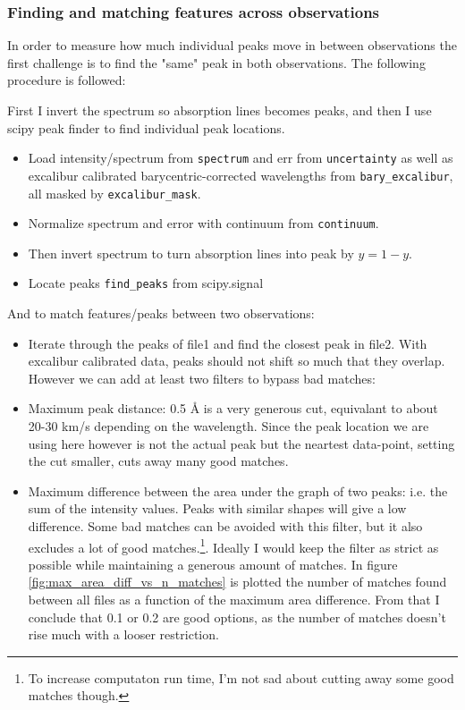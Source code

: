     \subsubsection{Finding and matching features across observations}

    In order to measure how much individual peaks move in between observations the first challenge is to find the "same" peak in both observations. The following procedure is followed: 
    
    
    First I invert the spectrum so absorption lines becomes peaks, and then I use scipy peak finder to find individual peak locations. 

    \begin{itemize}
        \item Load intensity/spectrum from \verb|spectrum| and err from \verb|uncertainty| as well as excalibur calibrated barycentric-corrected wavelengths from \verb|bary_excalibur|, all masked by \verb|excalibur_mask|.
        \item Normalize spectrum and error with continuum from \verb|continuum|.
        \item Then invert spectrum to turn absorption lines into peak by $y = 1 - y$.
        \item Locate peaks \verb|find_peaks| from scipy.signal
    \end{itemize}

    And to match features/peaks between two observations:
    \begin{itemize}
        \item Iterate through the peaks of file1 and find the closest peak in file2. With excalibur calibrated data, peaks should not shift so much that they overlap. However we can add at least two filters to bypass bad matches:
        \item Maximum peak distance: 0.5 Å is a very generous cut, equivalant to about 20-30 km/s depending on the wavelength. Since the peak location we are using here however is not the actual peak but the neartest data-point, setting the cut smaller, cuts away many good matches.
        \item Maximum difference between the area under the graph of two peaks: i.e. the sum of the intensity values. Peaks with similar shapes will give a low difference. Some bad matches can be avoided with this filter, but it also excludes a lot of good matches.\footnote{To increase computaton run time, I'm not sad about cutting away some good matches though.}. Ideally I would keep the filter as strict as possible while maintaining a generous amount of matches. In figure \ref{fig:max_area_diff_vs_n_matches} is plotted the number of matches found between all files as a function of the maximum area difference. From that I conclude that 0.1 or 0.2 are good options, as the number of matches doesn't rise much with a looser restriction.
    \end{itemize}

